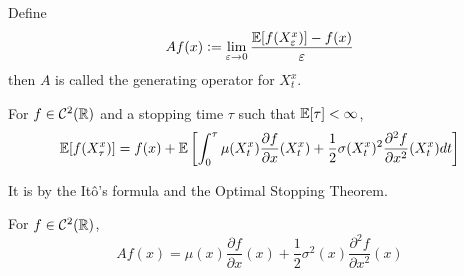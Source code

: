 \documentclass[a4paper,12pt]{article}
\begin{document}
\begin{itemize}
  \noindent Define
  \begin{equation*}
    Af(x) \vcentcolon= \lim_{\varepsilon \rightarrow 0}\frac{\mathbb{E}[f(X_{\varepsilon}^x)]-f(x)}{\varepsilon}
  \end{equation*}
  then $A$ is called the generating operator for $X_t^x$.

  \begin{lem}
    For $f \in \mathcal{C}^2(\mathbb{R})$ and a stopping time $\tau$ such that $\mathbb{E}[\tau] < \infty$,
    \begin{equation*}
      \mathbb{E}[f(X^x_{\tau})] = f(x) + \mathbb{E}\left[\int_0^{\tau} \mu(X^x_t)\frac{\partial f}{\partial x}(X^x_t) + \frac{1}{2}\sigma(X^x_t)^2\frac{\partial^2 f}{\partial x^2}(X^x_t) dt\right]
    \end{equation*}
  \end{lem}
  It is by the It\^o's formula and the Optimal Stopping Theorem.

  \begin{thm}
    For $f \in \mathcal{C}^2(\mathbb{R})$,
    \begin{equation*}
      Af(x) = \mu(x)\frac{\partial f}{\partial x}(x) + \frac{1}{2}\sigma^2(x)\frac{\partial^2 f}{\partial x^2}(x)
    \end{equation*}
  \end{thm}
\end{itemize}
\end{document}
